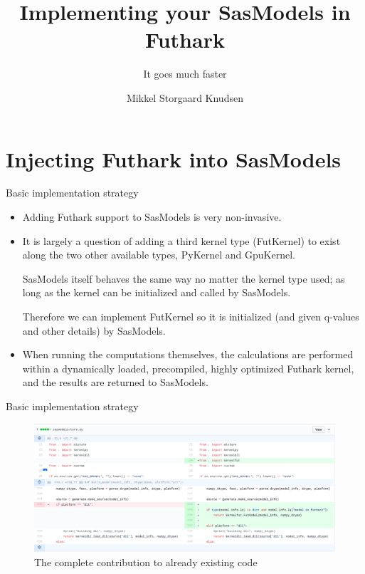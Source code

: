 \documentclass[10pt]{beamer}
\title{Implementing your  SasModels in Futhark}
\subtitle{It goes much faster}
\date{}
\author{Mikkel Storgaard Knudsen}
\begin{document}
\maketitle

\section{Injecting Futhark into SasModels}

\begin{frame}[fragile]{Basic implementation strategy}
  \begin{itemize}[<+->]
  \item Adding Futhark support to SasModels is very non-invasive.

  \item It is largely a question of adding a third kernel type (FutKernel)
  to exist along the two other available types, PyKernel and GpuKernel.

  SasModels itself behaves the same way no matter the kernel type used;
  as long as the kernel can be initialized and called by SasModels.

  Therefore we can implement FutKernel so it is initialized (and given q-values
  and other details) by SasModels.

  \item When running the computations themselves, the calculations are performed within
  a dynamically loaded, precompiled, highly optimized Futhark kernel, and the
  results are returned to SasModels.
\end{itemize}
\end{frame}
\begin{frame}[fragile]{Basic implementation strategy}

  \begin{figure}
    \includegraphics[scale=0.21]{figs/diff.png}
  \caption{The complete contribution to already existing code}
  \end{figure}
\end{frame}
\end{document}
